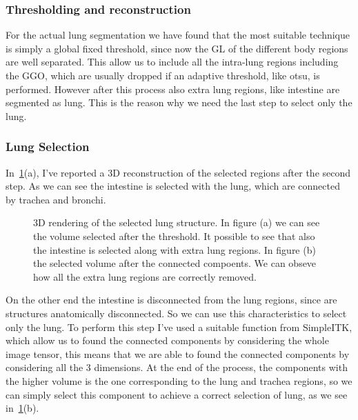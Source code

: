 \documentclass{standalone}
\begin{document}
	

	\subsubsection*{Thresholding and reconstruction}
	
	For the actual lung segmentation we have found that the most suitable technique is simply a global fixed threshold, since now the GL of the different body regions are well separated. This allow us to include all the intra-lung regions including the GGO, which are usually dropped if an adaptive threshold, like otsu, is performed.
	However after this process  also extra lung regions, like intestine are segmented as lung. This is the reason why we need the last step to select only the lung.
	
	\subsubsection*{Lung Selection}
	
	In \figurename\,\ref{fig:lungSelection}(a), I've reported a 3D reconstruction of the selected regions after the second step. As we can see the intestine is selected with the lung, which are connected by trachea and bronchi. 
	
	
	
	\begin{figure}[h]
		\centering
		\label{fig:lungSelection}\caption{3D rendering of the selected lung structure. In figure (a) we can see the volume selected after the threshold. It possible to see that also the intestine is selected along with extra lung regions. In figure (b) the selected volume after the connected compoents. We can obseve how all the extra lung regions are correctly removed.} 
	\end{figure}
	
	On the other end the intestine is disconnected from the lung regions, since are structures anatomically disconnected. So we can use this characteristics to select only the lung. To perform this step I've used a suitable function from SimpleITK, which allow us to found the connected components by considering the whole image tensor, this means that we are able to found the connected components by considering all the 3 dimensions. At the end of the process, the components with the higher volume is the one corresponding to the lung and trachea regions, so we can simply select this component to achieve a correct selection of lung, as we see in \figurename\,\ref{fig:lungSelection}(b).
	
\end{document}
